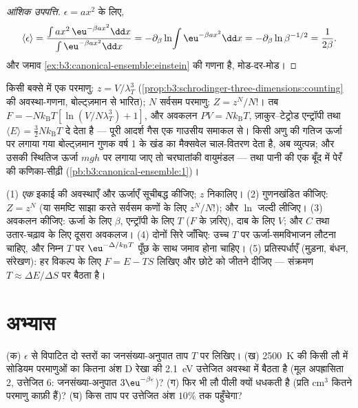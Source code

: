 \begin{proof}[आंशिक उपपत्ति]
$\epsilon = ax^2$ के लिए,
\[
\langle\epsilon\rangle
 = \frac{\int ax^2\,\eu^{-\beta ax^2}\dd x}
        {\int\eu^{-\beta ax^2}\dd x}
 = -\partial_\beta\ln\!\int\eu^{-\beta ax^2}\dd x
 = -\partial_\beta\ln\beta^{-1/2} = \frac{1}{2\beta} .
\] और जमाव \cref{ex:b3:canonical-ensemble:einstein} की गणना है,
मोड-दर-मोड।
\end{proof}

\begin{example}[गैस, विहित ढंग से]\label{ex:b3:canonical-ensemble:gas}
किसी बक्से में एक परमाणु: $z = V/\lambda_T^3$
(\cref{prop:b3:schrodinger-three-dimensions:counting} की अवस्था-गणना,
बोल्ट्ज़मान से भारित); $N$ सर्वसम परमाणु: $Z = z^N/N!$। तब $F =
-Nk_{\text{B}}T[\ln(V/N\lambda_T^3) + 1]$, और अवकलन
$PV = Nk_{\text{B}}T$, ज़ाकुर--टेट्रोड एन्ट्रॉपी तथा
$\langle E\rangle = \tfrac32 Nk_{\text{B}}T$ दे देता है --- पूरी
आदर्श गैस एक गाउसीय समाकल से। किसी अणु की गतिज ऊर्जा पर लगाया गया
बोल्ट्ज़मान गुणक वर्ष 1 के खंड का मैक्सवेल चाल-वितरण देता है, अब
व्युत्पन्न; और उसकी स्थितिज ऊर्जा
$mgh$ पर लगाया जाए तो चरघातांकी वायुमंडल --- तथा पानी की एक बूँद में
पेरँ की कणिका-सीढ़ी
(\cref{pb:b3:canonical-ensemble:1})।
\end{example}

\begin{method}[विहित कारीगरी]\label{met:b3:canonical-ensemble:method}
(1) \emph{एक} इकाई की अवस्थाएँ और ऊर्जाएँ सूचीबद्ध कीजिए; $z$ निकालिए।
(2) गुणनखंडित कीजिए: $Z = z^N$ (या समष्टि साझा करते सर्वसम कणों के लिए
$z^N/N!$); और $\ln$ जल्दी लीजिए। (3) अवकलन कीजिए: ऊर्जा के लिए $\beta$,
एन्ट्रॉपी के लिए $T$ ($F$ के ज़रिए), दाब के लिए $V$; और $C$ तथा
उतार-चढ़ाव के लिए दूसरा अवकलज। (4) दोनों सिरे जाँचिए: उच्च $T$ पर
ऊर्जा-समविभाजन लौटना चाहिए, और निम्न $T$ पर
$\eu^{-\Delta/k_{\text{B}}T}$ पूँछ के साथ जमाव होना चाहिए। (5)
प्रतिस्पर्धाएँ (मुड़ना, बंधन, संरेखण): हर विकल्प के लिए $F = E - TS$
लिखिए और छोटे को जीतने दीजिए --- संक्रमण $T \approx \Delta
E/\Delta S$ पर बैठता है।
\end{method}

\section{अभ्यास}

\begin{exercise}[$\star$]\label{exo:b3:canonical-ensemble:1}
(क) $\epsilon$ से विपाटित दो स्तरों का जनसंख्या-अनुपात
ताप $T$ पर लिखिए। (ख) \qty{2500}{K} की किसी लौ में सोडियम
परमाणुओं का कितना अंश D रेखा की \qty{2.1}{eV} उत्तेजित अवस्था में
बैठता है (मूल अपह्रासिता 2, उत्तेजित 6: जनसंख्या-अनुपात
$3\eu^{-\beta\epsilon}$)?
(ग) फिर भी लौ पीली क्यों धधकती है (प्रति
cm$^3$ कितने परमाणु काफ़ी हैं)? (घ) किस ताप पर उत्तेजित अंश
$10\%$ तक पहुँचेगा?
\end{exercise}

